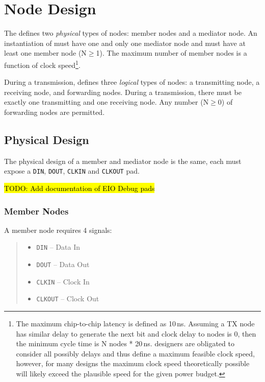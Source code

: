 \section{Node Design}
\label{sec:node}
The \bus defines two {\em physical} types of nodes: member nodes and a
mediator node. An instantiation of \bus must have one and only one mediator
node and must have at least one member node (N$\geq$1). The maximum number of
member nodes is a function of clock speed\footnote{
  The maximum chip-to-chip latency is defined as 10\,ns. Assuming a TX node has
similar delay to generate the next bit and clock delay to nodes is 0, then the
minimum cycle time is N nodes * 20\,ns. \bus designers are obligated to
consider all possibly delays and thus define a maximum feasible clock speed,
however, for many designs the maximum clock speed theoretically possible will
likely exceed the plausible speed for the given power budget.}.

During a transmission, \bus defines three {\em logical} types of nodes:
a transmitting node, a receiving node, and forwarding nodes. During a
transmission, there must be exactly one transmitting and one receiving node.
Any number (N$\geq$0) of forwarding nodes are permitted.

\subsection{Physical Design}
\label{sec:physical}

The physical design of a member and mediator node is the same, each must
expose a {\tt DIN}, {\tt DOUT}, {\tt CLKIN} and {\tt CLKOUT} pad.

\hl{TODO: Add documentation of EIO Debug pads}

\subsubsection{Member Nodes}
\label{sec:physical-member}
A member node requires 4 signals:

\begin{quote}
\begin{itemize}
  \item[] {\tt DIN} -- Data In
  \item[] {\tt DOUT} -- Data Out
  \item[] {\tt CLKIN} -- Clock In
  \item[] {\tt CLKOUT} -- Clock Out
\end{itemize}
\end{quote}

